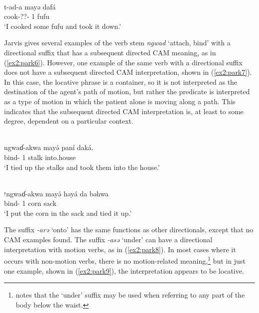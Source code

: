 \ex\label{ex2:park5}
 \\
\gll t-ad-a mayə dafá	\\
cook-??- 1 fufu	 \\
\glt `I cooked some fufu and took it down.'
\z 

Jarvis gives several examples of the verb stem \textit{ngwad} `attach, bind' with a directional suffix that has a subsequent directed CAM meaning, as in (\ref{ex2:park6}). However, one example of the same verb with a directional suffix does not have a subsequent directed CAM interpretation, shown in (\ref{ex2:park7}). In this case, the locative phrase is a container, so it is not interpreted as the destination of the agent's path of motion, but rather the predicate is interpreted as a type of motion in which the patient alone is moving along a path. This indicates that the subsequent directed CAM interpretation is, at least to some degree, dependent on a particular context. 

\ea\label{ex2:park6}
 \\
\gll ngwaɗ-akwa mayə́ paní daká.	\\
bind- 1 stalk into.house	\\
\glt `I tied up the stalks and took them into the house.'

\ex\label{ex2:park7}
 \\
\gll ʸngwaɗ-akwa mayə́ həyá da bəhwa \\
bind- 1 corn  sack \\
\glt `I put the corn in the sack and tied it up.'
\z

The suffix \textit{-arə} `onto' has the same functions as other directionals, except that no CAM examples found. The suffix \textit{-asə} `under' can have a directional interpretation with motion verbs, as in (\ref{ex2:park8}). In most cases where it occurs with non-motion verbs, there is no motion-related meaning,\footnote{\citet[320]{jarvisPodokoVerbalDirectionals1983} notes that the `under' suffix may be used when referring to any part of the body below the waist.} but in just one example, shown in (\ref{ex2:park9}), the interpretation appears to be locative. 

